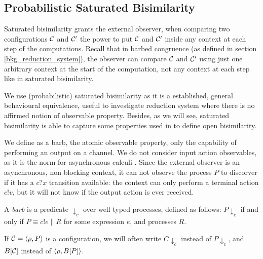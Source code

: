 \subsection{Probabilistic Saturated Bisimilarity}

Saturated bisimilarity \cite{bonchiGeneralTheoryBarbs2014} grants the external observer, when comparing two configurations $\mathcal{C}$ and $\mathcal{C}'$ the power to put $\mathcal{C}$ and $\mathcal{C}'$ inside any context at each step of the computations. Recall that in barbed congruence (as defined in section \ref{bkg_reduction_system}), the observer can compare $\mathcal{C}$ and $\mathcal{C}'$ using just one arbitrary context at the start of the computation, not any context at each step like in saturated bisimilarity.

We use (probabilistic) saturated bisimilarity as it is a established, general behavioural equivalence, useful to investigate reduction system where there is no affirmed notion of observable property. Besides, as we will see, saturated bisimilarity is able to capture some properties used in \cite{dengOpenBisimulationQuantum2012} to define open bisimilarity.


We define as a barb, the atomic observable property, only the capability of performing an output on a channel. We do not consider input action observables, as it is the norm for asynchronous calculi \cite{amadioBisimulationsAsynchronousPcalculus1998}. Since the external observer is an asynchronous, non blocking context, it can not observe the process $P$ to discorver if it has a $c?x$ transition available: the context can only perform a terminal action $c!v$, but it will not know if the output action is ever received.

\begin{definition}[Barb]
	A \emph{barb} is a predicate $\downarrow_{c}$ over well typed processes, defined as follows: $P \downarrow_{c}$ if and only if $P \equiv c!e \parallel R$ for some expression $e$, and processes $R$.
\end{definition}


If $\mathcal{C} = \langle\rho, P\rangle$ is a configuration, we will often write $C\downarrow_c$ instead of $P\downarrow_c$, and $B[\mathcal{C}]$ instead of $\langle\rho, B[P]\rangle$.

